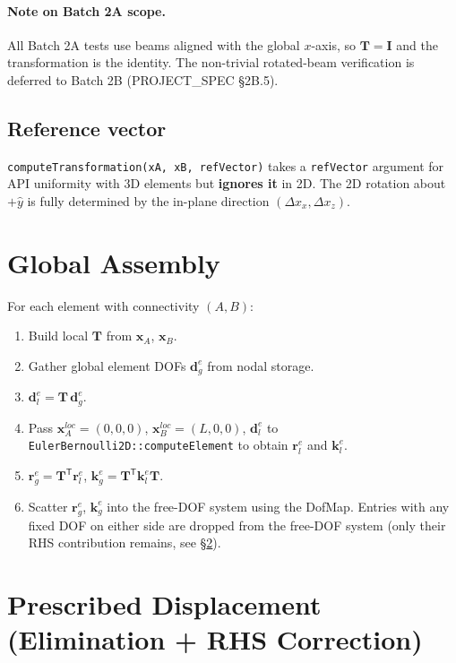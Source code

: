 \documentclass[11pt,a4paper]{article}
\newcommand{\bmath}[1]{\boldsymbol{#1}}
\begin{document}
\paragraph{Note on Batch 2A scope.}
All Batch 2A tests use beams aligned with the global $x$-axis, so $\bmath{T} = \bmath{I}$ and the transformation is the identity. The non-trivial rotated-beam verification is deferred to Batch 2B (PROJECT\_SPEC \S 2B.5).

\subsection{Reference vector}

\texttt{computeTransformation(xA, xB, refVector)} takes a \texttt{refVector} argument for API uniformity with 3D elements but \textbf{ignores it} in 2D. The 2D rotation about $+\hat{y}$ is fully determined by the in-plane direction $(\Delta x_x, \Delta x_z)$.

\section{Global Assembly}

For each element with connectivity $(A, B)$:
\begin{enumerate}
    \item Build local $\bmath{T}$ from $\bmath{x}_A$, $\bmath{x}_B$.
    \item Gather global element DOFs $\bmath{d}_g^e$ from nodal storage.
    \item $\bmath{d}_l^e = \bmath{T}\,\bmath{d}_g^e$.
    \item Pass $\bmath{x}_A^{loc} = (0,0,0)$, $\bmath{x}_B^{loc} = (L,0,0)$, $\bmath{d}_l^e$ to \texttt{EulerBernoulli2D::computeElement} to obtain $\bmath{r}_l^e$ and $\bmath{k}_l^e$.
    \item $\bmath{r}_g^e = \bmath{T}^\mathsf{T}\bmath{r}_l^e$, $\bmath{k}_g^e = \bmath{T}^\mathsf{T}\bmath{k}_l^e\bmath{T}$.
    \item Scatter $\bmath{r}_g^e$, $\bmath{k}_g^e$ into the free-DOF system using the DofMap. Entries with any fixed DOF on either side are dropped from the free-DOF system (only their RHS contribution remains, see \S\ref{sec:prescribed}).
\end{enumerate}

\section{Prescribed Displacement (Elimination + RHS Correction)}\label{sec:prescribed}
\end{document}
